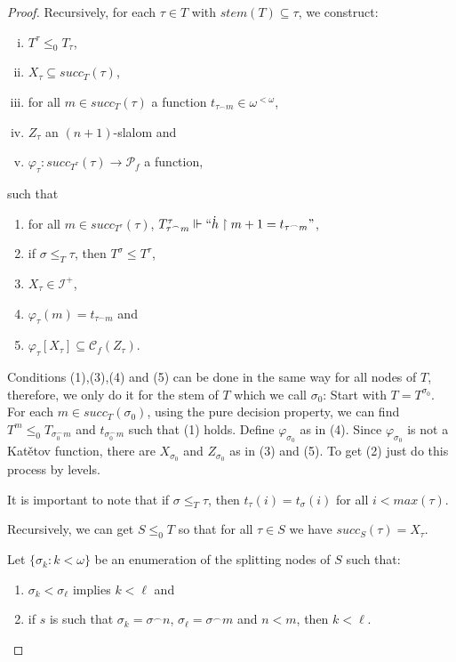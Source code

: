 \documentclass{amsart}
\theoremstyle{definition}
\theoremstyle{remark}
\numberwithin{equation}{section}
\newcommand{\id}{\mathcal{I}}
\begin{document}
\begin{proof}
Recursively, for each $\tau\in T$ with $stem(T)\subseteq \tau$, we construct:
\begin{enumerate}[(i)]
    \item $T^\tau\leq_0 T_\tau$,
    \item $X_{\tau}\subseteq succ_T(\tau)$,
    \item for all $m\in succ_T(\tau) $ a function $t_{\tau^\frown m}\in \omega^{<\omega}$,
    \item $Z_\tau$ an $(n+1)$-slalom and
    \item $\varphi_\tau:succ_{T^\tau}(\tau)\rightarrow\mathcal{P}_f$ a function,
\end{enumerate}
such that
\begin{enumerate}
    \item for all $m\in succ_{T^\tau}(\tau)$, $ T^\tau_{\tau^\frown m}\Vdash``\dot h \upharpoonright m+1 = t_{\tau^\frown m}" $,
    \item if $\sigma\leq_T \tau$, then $T^\sigma\leq T^\tau$,
    \item $X_\tau\in \id^+$,
    \item $\varphi_\tau(m)=t_{\tau^\frown m}$ and
    \item $\varphi_\tau[X_\tau]\subseteq \mathcal{C}_f(Z_\tau)$.
\end{enumerate}

Conditions (1),(3),(4) and (5) can be done in the same way for all nodes of $T$, therefore, we only do it for the stem of $T$ which we call $\sigma_0$: Start with $T=T^{\sigma_0}$. For each $m\in succ_T(\sigma_0)$, using the pure decision property, we can find $T^m\leq_0T_{\sigma_0^\frown m}$ and $t_{\sigma_0^\frown m}$ such that (1) holds. Define $\varphi_{\sigma_0}$ as in (4). Since $\varphi_{\sigma_0}$ is not a Kat\v{e}tov function, there are $X_{\sigma_0}$ and $Z_{\sigma_0}$ as in (3) and (5). To get (2) just do this process by levels.

It is important to note that if $\sigma\leq_T \tau$, then $t_\tau (i)=t_\sigma(i)$ for all $i<max(\tau)$.

Recursively, we can get $S\leq_0 T$ so that for all $\tau\in S$ we have $succ_S(\tau)=X_\tau$. 

Let $\{\sigma_k:k<\omega\}$ be  an enumeration of the splitting nodes of $S$ such that:
\begin{enumerate}
    \item $\sigma_k<\sigma_\ell$ implies $k<\ell$ and
    \item if $s$ is such that $\sigma_k=\sigma^\frown n$, $\sigma_\ell=\sigma^\frown m$ and $n<m$, then $k<\ell$.
\end{enumerate}


\end{proof}
\end{document}
